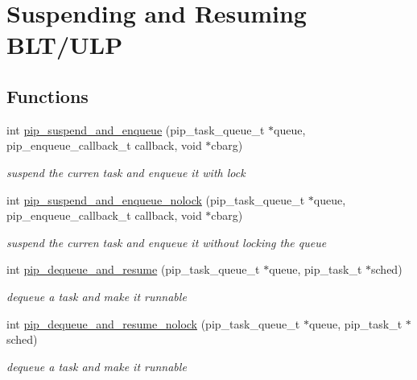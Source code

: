 \hypertarget{group__ULP-2-suspension}{\section{Suspending and Resuming B\-L\-T/\-U\-L\-P}
\label{group__ULP-2-suspension}
}
\subsection*{Functions}
\begin{DoxyCompactItemize}
\item 
int \hyperlink{group__ULP-2-suspension_ga7dbf7e64e78cd00ef62c3bb04f289a68}{pip\-\_\-suspend\-\_\-and\-\_\-enqueue} (pip\-\_\-task\-\_\-queue\-\_\-t $\ast$queue, pip\-\_\-enqueue\-\_\-callback\-\_\-t callback, void $\ast$cbarg)
\begin{DoxyCompactList}\small\item\em suspend the curren task and enqueue it with lock \end{DoxyCompactList}\item 
int \hyperlink{group__ULP-2-suspension_gab78d289ab89fa2981f2910849b1b2df7}{pip\-\_\-suspend\-\_\-and\-\_\-enqueue\-\_\-nolock} (pip\-\_\-task\-\_\-queue\-\_\-t $\ast$queue, pip\-\_\-enqueue\-\_\-callback\-\_\-t callback, void $\ast$cbarg)
\begin{DoxyCompactList}\small\item\em suspend the curren task and enqueue it without locking the queue \end{DoxyCompactList}\item 
int \hyperlink{group__ULP-2-suspension_gaaff299f195e2397f17cf11016c8a394f}{pip\-\_\-dequeue\-\_\-and\-\_\-resume} (pip\-\_\-task\-\_\-queue\-\_\-t $\ast$queue, pip\-\_\-task\-\_\-t $\ast$sched)
\begin{DoxyCompactList}\small\item\em dequeue a task and make it runnable \end{DoxyCompactList}\item 
int \hyperlink{group__ULP-2-suspension_gab3c26770ac6de70ad11239dc301bd403}{pip\-\_\-dequeue\-\_\-and\-\_\-resume\-\_\-nolock} (pip\-\_\-task\-\_\-queue\-\_\-t $\ast$queue, pip\-\_\-task\-\_\-t $\ast$sched)
\begin{DoxyCompactList}\small\item\em dequeue a task and make it runnable \end{DoxyCompactList}\item 

\end{DoxyCompactItemize}
